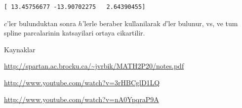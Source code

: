 \documentclass[12pt,fleqn]{article}\usepackage{../common}
\begin{document}
\begin{verbatim}
[ 13.45756677 -13.90702275   2.64390455]
\end{verbatim}

$c$'ler bulunduktan sonra $h$'lerle beraber kullanilarak $d$'ler bulunur,
vs, ve tum spline parcalarinin katsayilari ortaya cikartilir.

Kaynaklar

\url{http://spartan.ac.brocku.ca/~jvrbik/MATH2P20/notes.pdf}

\url{http://www.youtube.com/watch?v=3rHBCglD1LQ}

\url{http://www.youtube.com/watch?v=nA0YpqraP9A}
\end{document}
